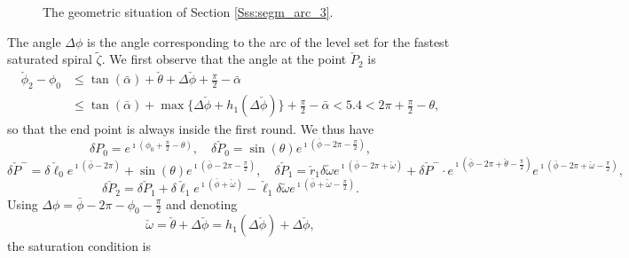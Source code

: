 \documentclass[reqno]{amsart}
\theoremstyle{definition} \newtheorem{definition}{Definition}[section]
\theoremstyle{definition} \newtheorem{remark}[definition]{Remark}
\theoremstyle{plain} \newtheorem{lemma}[definition]{Lemma}
\theoremstyle{plain} \newtheorem{proposition}[definition]{Proposition}
\theoremstyle{plain} \newtheorem{theorem}[definition]{Theorem}
\theoremstyle{plain} \newtheorem{corollary}[definition]{Corollary}
\theoremstyle{definition} \newtheorem{example}[definition]{Example}
\theoremstyle{plain} \newtheorem{claim}[clai]{Claim}
\theoremstyle{definition} \newtheorem{assumption}[definition]{Assumption}
\theoremstyle{definition} \newtheorem{observation}[definition]{Observation}
\newcommand{\1}{\mathbbm 1}
\renewcommand{\i}{\imath}
\numberwithin{equation}{section} %
\theoremstyle{plain} \newtheorem*{theorem*}{Theorem}
\theoremstyle{plain} \newtheorem{mthm}[maintheorem]{Main Theorem}
\theoremstyle{plain} \newtheorem*{mthm*}{Main Theorem}
\theoremstyle{plain} \newtheorem*{conjecture*}{Conjecture}
\theoremstyle{plain} \newtheorem{conjecture}[definition]{Conjecture}
\theoremstyle{plain} \newtheorem*{problem*}{Problem}
\begin{document}
\begin{figure}
\resizebox{.75\textwidth}{!}{}
\caption{The geometric situation of Section \ref{Sss:segm_arc_3}.}
\label{Fig:segm_arc_3}
\end{figure}

The angle $\Delta \phi$ is the angle corresponding to the arc of the level set for the fastest saturated spiral $\tilde \zeta$. We first observe that the angle at the point $\check P_2$ is
\begin{equation}
\label{Equa:max_arc_arc}
\begin{split}
\check \phi_2 - \phi_0 &\leq \tan(\bar \alpha) + \check \theta + \Delta \check \phi + \frac{\pi}{2} - \bar \alpha \\
&\leq \tan(\bar \alpha) + \max \big\{ \Delta \check \phi + h_1(\Delta \check \phi) \big\} + \frac{\pi}{2} - \bar \alpha < 5.4 < 2\pi + \frac{\pi}{2} - \theta,
\end{split}
\end{equation}
so that the end point is always inside the first round. We thus have
\begin{equation*}
\delta P_0 = e^{\i (\phi_0 + \frac{\pi}{2} - \theta)}, \quad \delta \check P_0 = \sin(\theta) e^{\i (\bar \phi - 2\pi - \frac{\pi}{2})},
\end{equation*}
\begin{equation*}
\delta \check P^- = \delta \check \ell_0 e^{\i (\bar \phi - 2\pi)} + \sin(\theta) e^{\i (\bar \phi - 2\pi - \frac{\pi}{2})}, \quad \delta \check P_1 = \check r_1 \delta \check \omega e^{\i (\bar \phi - 2\pi + \check \omega)} +  \delta \check P^- \cdot e^{\i (\bar \phi - 2\pi + \check \theta - \frac{\pi}{2})} e^{\i (\bar \phi - 2\pi + \check \omega - \frac{\pi}{2})},
\end{equation*}
\begin{equation*}
\delta \check P_2 = \delta \check P_1 + \delta \check \ell_1 e^{\i (\bar \phi + \check \omega)} - \check \ell_1 \delta \check \omega e^{\i (\bar \phi + \check \omega - \frac{\pi}{2})}.
\end{equation*}
Using $\Delta \phi = \bar \phi - 2\pi - \phi_0 - \frac{\pi}{2}$ and denoting
$$
\check \omega = \check \theta + \Delta \check \phi = h_1(\Delta \check \phi) + \Delta \check \phi,
$$
the saturation condition is
\end{document}
